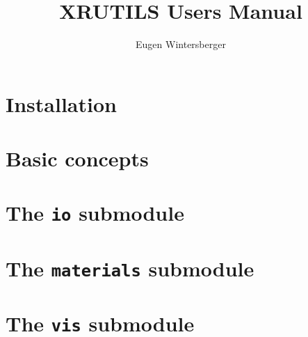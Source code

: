 \documentclass[a4paper]{book}
\title{{\Huge XRUTILS Users Manual}}
\author{Eugen Wintersberger}
\begin{document}
\maketitle
\tableofcontents
\chapter{Installation}


\chapter{Basic concepts}


\chapter{The {\tt io} submodule}


\chapter{The {\tt materials} submodule}


\chapter{The {\tt vis} submodule}

\end{document}
